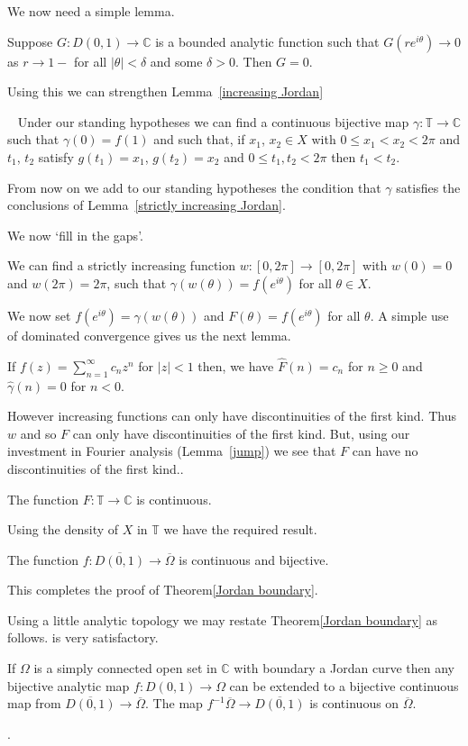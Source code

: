 We now need a simple lemma.
\begin{lemma} Suppose $G:D(0,1)\rightarrow{\mathbb C}$ 
is a bounded analytic function such that
$G(r e^{i\theta})\rightarrow 0$ as $r\rightarrow 1-$
for all $|\theta|<\delta$
and some $\delta>0$. Then $G=0$.
\end{lemma}
Using this we can strengthen Lemma~\ref{increasing Jordan}
\begin{lemma}~\label{strictly increasing Jordan}
Under our standing hypotheses we
can find a continuous bijective
map $\gamma:{\mathbb T}\rightarrow{\mathbb C}$
such that $\gamma(0)=f(1)$ and
such that, if $x_{1}$, $x_{2}\in X$ with
$0\leq x_{1}< x_{2} <2\pi$ and $t_{1}$, $t_{2}$
satisfy $g(t_{1})=x_{1}$, $g(t_{2})=x_{2}$
and $0\leq t_{1}, t_{2}<2\pi$ then $t_{1}< t_{2}$.
\end{lemma}
From now on we add to our standing hypotheses
the condition that $\gamma$ satisfies the conclusions
of Lemma~\ref{strictly increasing Jordan}.

We now `fill in the gaps'.
\begin{lemma} We can find a strictly increasing function                     $w:[0,2\pi]\rightarrow [0,2\pi]$ with $w(0)=0$ 
and $w(2\pi)=2\pi$,
such that $\gamma(w(\theta))=f(e^{i\theta})$ for all
$\theta\in X$.
\end{lemma}
We now set $f(e^{i\theta})=\gamma(w(\theta))$ 
and $F(\theta)=f(e^{i\theta})$ for all $\theta$.
A simple use of dominated convergence gives us the next lemma.
\begin{lemma} If $f(z)=\sum_{n=1}^{\infty}c_{n}z^{n}$
for $|z|<1$ then,
we have $\hat{F}(n)=c_{n}$ for $n\geq 0$ and
$\hat{\gamma}(n)=0$ for $n<0$.
\end{lemma}
However increasing functions
can only have discontinuities of the first kind.
Thus $w$ and so $F$ can only have discontinuities
of the first kind. But, using our investment in Fourier
analysis (Lemma~\ref{jump}) we see that $F$ can have no
discontinuities
of the first kind..
\begin{lemma} The function $F:{\mathbb T}\rightarrow{\mathbb C}$
is continuous.
\end{lemma}
Using the density of $X$ in ${\mathbb T}$ we have the required
result.
\begin{lemma} The function 
$f:\overline{D(0,1)}\rightarrow\overline{\Omega}$
is continuous and bijective.
\end{lemma} 
This completes the proof of Theorem\ref{Jordan boundary}.

Using a little analytic topology we may restate
Theorem\ref{Jordan boundary} as follows.
is very satisfactory.
\begin{theorem}\label{Jordan boundary both}
If $\Omega$ is a simply connected
open set in ${\mathbb C}$ with boundary a Jordan curve
then any bijective analytic map $f:D(0,1)\rightarrow \Omega$
can be extended to a bijective continuous map
from $\overline{D(0,1)}\rightarrow\overline{\Omega}$.
The map $f^{-1}\overline{\Omega}\rightarrow\overline{D(0,1)}$
is continuous on $\overline{\Omega}$.
\end{theorem}.
